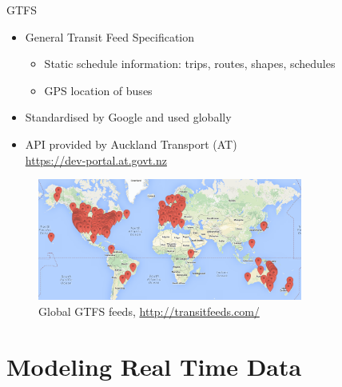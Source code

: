 \documentclass[10pt,t]{beamer}
\begin{document}
\begin{frame}{GTFS}
  \onslide<+->
  \begin{itemize}[<+- | alert@+>]
    \item General Transit Feed Specification
      \begin{itemize}
      \item Static schedule information: trips, routes, shapes,
        schedules
      \item GPS location of buses
      \end{itemize}

    \item Standardised by Google and used globally
    \item API provided by Auckland Transport (AT)\\
      \url{https://dev-portal.at.govt.nz}
  \end{itemize}

  \begin{overprint}
    \begin{figure}
      \vspace{-3em}
      \centering
      \includegraphics[height=4cm]{gtfs-feeds.png}
      \caption{Global GTFS feeds, \url{http://transitfeeds.com/}}
    \end{figure}
  \end{overprint}
  \onslide<+->
\end{frame}


\section{Modeling Real Time Data}
\end{document}
